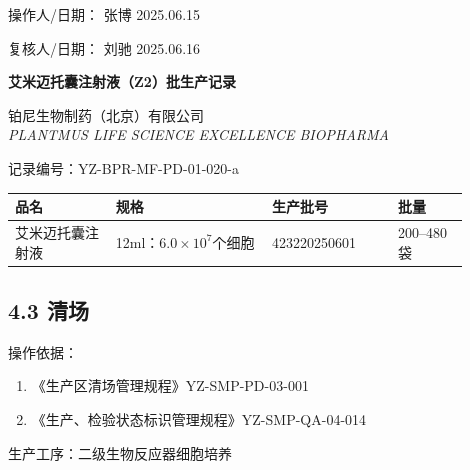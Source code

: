 \documentclass[UTF8,10pt,a4paper,fontset=fandol]{ctexart}
\newcommand{\fieldvalue}[1]{#1}
\newcommand{\handwritten}[1]{#1}
\begin{document}
操作人/日期：
\fieldvalue{\handwritten{张博}}
\quad
\fieldvalue{\handwritten{2025.06.15}}

\hfill
复核人/日期：
\fieldvalue{\handwritten{刘驰}}
\quad
\fieldvalue{\handwritten{2025.06.16}}

\newpage

\begin{center}
\textbf{艾米迈托囊注射液（Z2）批生产记录}
\end{center}

\begin{center}
铂尼生物制药（北京）有限公司\\
\textit{PLANTMUS LIFE SCIENCE EXCELLENCE BIOPHARMA}
\end{center}

记录编号：YZ-BPR-MF-PD-01-020-a

\begin{tabular}{|p{0.20\linewidth}|p{0.31\linewidth}|p{0.25\linewidth}|p{0.14\linewidth}|}
\hline
品名 & 规格 & 生产批号 & 批量\\
\hline
\fieldvalue{艾米迈托囊注射液} &
\fieldvalue{12ml：$6.0\times10^{7}$个细胞} &
\fieldvalue{\handwritten{423220250601}} &
\fieldvalue{200--480袋}\\
\hline
\end{tabular}

\subsection*{4.3 清场}

操作依据：

\begin{enumerate}
\item 《生产区清场管理规程》\hfill YZ-SMP-PD-03-001
\item 《生产、检验状态标识管理规程》\hfill YZ-SMP-QA-04-014
\end{enumerate}

生产工序：二级生物反应器细胞培养
\end{document}
